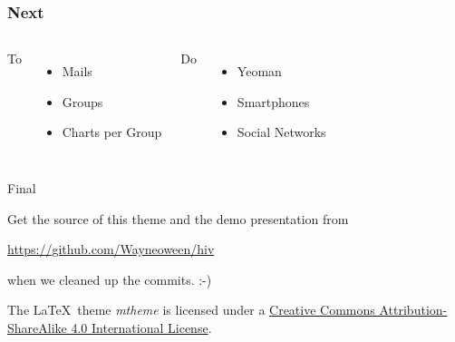 \documentclass[10pt, compress]{beamer}
\begin{document}
\begin{frame}[fragile]

  \frametitle{Next}

  \begin{columns}[onlytextwidth]
    \Large
    To
      \begin{itemize}
        \item Mails
        \item Groups
        \item Charts per Group
      \end{itemize}
    Do
      \begin{itemize}
        \item Yeoman
        \item Smartphones
        \item Social Networks
      \end{itemize}
  \end{columns}

\end{frame}

\begin{frame}{Final}

  Get the source of this theme and the demo presentation from

  \begin{center}\url{https://github.com/Wayneoween/hiv}\end{center}
  
  when we cleaned up the commits. :-)
  
  \vspace{1cm}
  \begin{center}
  {\small

  The \LaTeX \ theme \emph{mtheme} is licensed under a
  \href{http://creativecommons.org/licenses/by-sa/4.0/}{Creative Commons
  Attribution-ShareAlike 4.0 International License}.}

  \ccbysa
  
  \end{center}

\end{frame}

\end{document}

